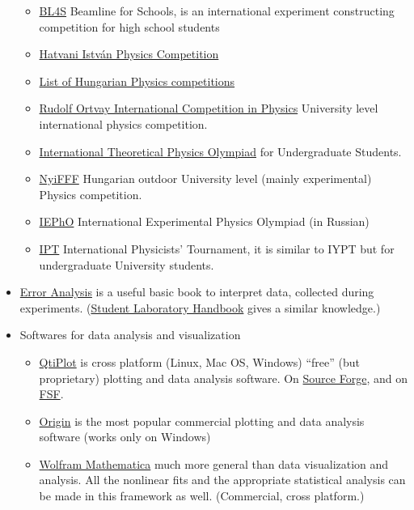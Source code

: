 \documentclass{article}
\begin{document}
\begin{itemize}
\begin{itemize}
\item \href{https://beamlineforschools.cern/home}{BL4S} Beamline for Schools, is an international experiment constructing competition for high school students

\item \href{http://hatvaniverseny.unideb.hu/}{Hatvani István Physics Competition}

\item \href{http://web.archive.org/web/20200318012748/http://fizika.fazekas.hu/index.php/2019/10/01/201920-as-tanev-versenyei-fizikabol/}{List of Hungarian Physics competitions}

\item \href{https://ortvay.elte.hu/main.html}{Rudolf Ortvay International Competition in Physics} University level international physics competition.

\item \href{http://thworldcup.com/about2020}{International Theoretical Physics Olympiad} for Undergraduate Students.

\item \href{http://nyifff.elte.hu/}{NyiFFF} Hungarian outdoor University level (mainly experimental)
Physics competition.

\item \href{http://iepho.ru/}{IEPhO} International Experimental Physics Olympiad (in Russian)

\item \href{https://iptnet.info/}{IPT} International Physicists' Tournament, it is similar to IYPT but for undergraduate University students.
\end{itemize}

\item \href{https://web.archive.org/web/20200318010340/http://hep.ucsb.edu/courses/ph128_18s/Taylor.pdf}{Error Analysis} is a useful basic book to interpret data, collected during experiments. (\href{https://web.archive.org/web/20190801072249/http://www2.phy.ilstu.edu/~wenning/slh/}{Student Laboratory Handbook} gives a similar knowledge.)

\item Softwares for data analysis and visualization
\begin{itemize}
    \item \href{https://www.qtiplot.com/index.html}{QtiPlot} is cross platform (Linux, Mac OS, Windows) ``free'' (but proprietary) plotting and data analysis software. On \href{https://sourceforge.net/projects/qtiplot.berlios/}{Source Forge}, and on \href{https://directory.fsf.org/wiki/Qtiplot}{FSF}.
    \item \href{https://www.originlab.com/}{Origin} is the most popular commercial plotting and data analysis software (works only on Windows)
    \item \href{https://www.wolfram.com/mathematica/}{Wolfram Mathematica} much more general than data visualization and analysis. All the nonlinear fits and the appropriate statistical analysis can be made in this framework as well. (Commercial, cross platform.)
\end{itemize}


\end{itemize}
\end{document}
